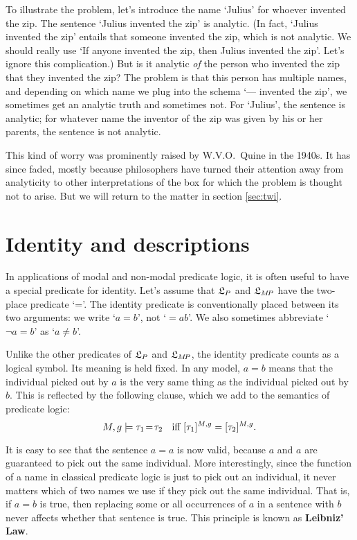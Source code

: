 To illustrate the problem, let's introduce the name `Julius' for whoever
invented the zip. The sentence `Julius invented the zip' is analytic. (In fact,
`Julius invented the zip' entails that someone invented the zip, which is not
analytic. We should really use `If anyone invented the zip, then Julius invented
the zip'. Let's ignore this complication.) But is it analytic \emph{of} the
person who invented the zip that they invented the zip? The problem is that this
person has multiple names, and depending on which name we plug into the schema
`--- invented the zip', we sometimes get an analytic truth and sometimes not.
For `Julius', the sentence is analytic; for whatever name the inventor of the
zip was given by his or her parents, the sentence is not analytic.

This kind of worry was prominently raised by W.V.O.\ Quine in the 1940s.  It has
since faded, mostly because philosophers have turned their attention away from
analyticity to other interpretations of the box for which the problem is thought
not to arise. But we will return to the matter in section \ref{sec:twi}.


\section{Identity and descriptions}
\label{sec:identity}

In applications of modal and non-modal predicate logic, it is often useful to
have a special predicate for identity. Let's assume that $\mathfrak{L}_P$ and $\mathfrak{L}_{M\!P}$
have the two-place predicate `='. The identity predicate is conventionally
placed between its two arguments: we write `$a=b$', not `$=\!ab$'. We also sometimes abbreviate `$\neg a\!=\!b$' as `$a\not=b$'. 

Unlike the other predicates of $\mathfrak{L}_P$ and $\mathfrak{L}_{M\!P}$, the identity predicate
counts as a logical symbol. Its meaning is held fixed. In any model, $a=b$
means that the individual picked out by $a$ is the very same thing as the
individual picked out by $b$. This is reflected by the following clause, which
we add to the semantics of predicate logic:
\[
  M,g \models \tau_1\!=\!\tau_2\text{ \; iff }[\tau_1]^{M,g} = [\tau_2]^{M,g}.
\]

It is easy to see that the sentence $a=a$ is now valid, because $a$ and $a$ are
guaranteed to pick out the same individual. More interestingly, since the
function of a name in classical predicate logic is just to pick out an
individual, it never matters which of two names we use if they pick out the same
individual. That is, if $a=b$ is true, then replacing some or all occurrences of
$a$ in a sentence with $b$ never affects whether that sentence is true. This
principle is known as \textbf{Leibniz' Law}.

